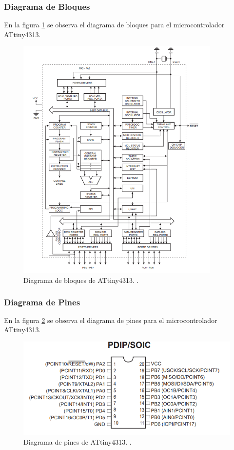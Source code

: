 \documentclass[12pt,letterpaper]{article}     %
\begin{document}
\subsubsection{Diagrama de Bloques}
En la figura \ref{F:bloques} se observa el diagrama de bloques para el microcontrolador ATtiny4313. 
\begin{figure}[H]
    \centering
    \includegraphics[width=0.9\textwidth]{imagenes/2.PNG}
    \caption{Diagrama de bloques de ATtiny4313. \cite{Microchip}.}
    \label{F:bloques}
    \end{figure}

\subsubsection{Diagrama de Pines}
En la figura \ref{F:pines} se observa el diagrama de pines para el microcontrolador ATtiny4313. 

\begin{figure}[H]
    \centering
    \includegraphics[width=1.0\textwidth]{imagenes/1.PNG}
    \caption{Diagrama de pines de ATtiny4313. \cite{Microchip}.}
    \label{F:pines}
    \end{figure}
\end{document}

